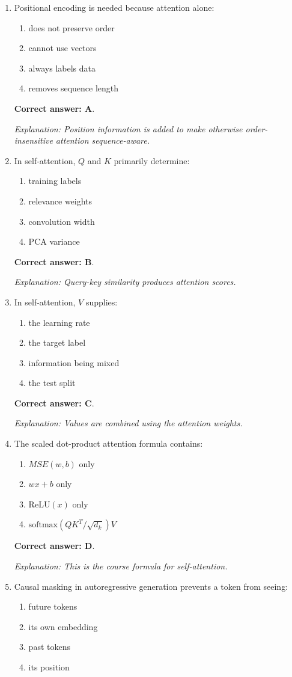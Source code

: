 \documentclass[10pt,a4paper]{article}
\newcommand{\ans}[1]{\par\textbf{Correct answer: #1}}
\newcommand{\expn}[1]{\par\textit{Explanation: #1}}
\begin{document}
\begin{enumerate}[label=\textbf{\arabic*.},itemsep=4pt]
\ans{D}. \expn{An embedding layer maps token IDs to trainable vector representations.}
\item Positional encoding is needed because attention alone:
\begin{enumerate}[label=\Alph*.,itemsep=0pt]\item does not preserve order\item cannot use vectors\item always labels data\item removes sequence length\end{enumerate}
\ans{A}. \expn{Position information is added to make otherwise order-insensitive attention sequence-aware.}
\item In self-attention, $Q$ and $K$ primarily determine:
\begin{enumerate}[label=\Alph*.,itemsep=0pt]\item training labels\item relevance weights\item convolution width\item PCA variance\end{enumerate}
\ans{B}. \expn{Query-key similarity produces attention scores.}
\item In self-attention, $V$ supplies:
\begin{enumerate}[label=\Alph*.,itemsep=0pt]\item the learning rate\item the target label\item information being mixed\item the test split\end{enumerate}
\ans{C}. \expn{Values are combined using the attention weights.}
\item The scaled dot-product attention formula contains:
\begin{enumerate}[label=\Alph*.,itemsep=0pt]\item $MSE(w,b)$ only\item $wx+b$ only\item $\mathrm{ReLU}(x)$ only\item $\mathrm{softmax}(QK^T/\sqrt{d_k})V$\end{enumerate}
\ans{D}. \expn{This is the course formula for self-attention.}
\item Causal masking in autoregressive generation prevents a token from seeing:
\begin{enumerate}[label=\Alph*.,itemsep=0pt]\item future tokens\item its own embedding\item past tokens\item its position\end{enumerate}

\end{enumerate}
\end{document}
